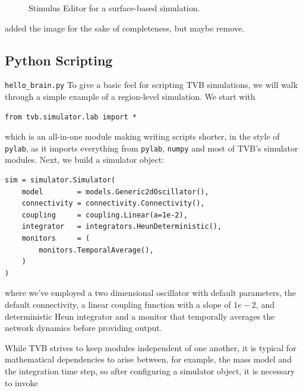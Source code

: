   \begin{figure}[!htbp]
    \centering
    \caption{Stimulus Editor for a surface-based simulation.}
        \label{fig:stimulus}
  \end{figure}

  \note[psl] added the image for the sake of completeness, but maybe remove.  


\subsection{Python Scripting}

\texttt{hello\_brain.py}
To give a basic feel for scripting TVB simulations, we will 
walk through a simple example of a region-level simulation. We 
start with

\begin{lstlisting}
from tvb.simulator.lab import *
\end{lstlisting}

\noindent which is an all-in-one module making writing scripts
shorter, in the style of \texttt{pylab}, as it imports everything
from \texttt{pylab}, \texttt{numpy} and most of TVB's simulator
modules. Next, we build a simulator object:

\begin{lstlisting}
sim = simulator.Simulator(
    model        = models.Generic2dOscillator(), 
    connectivity = connectivity.Connectivity(),
    coupling     = coupling.Linear(a=1e-2),
    integrator   = integrators.HeunDeterministic(),
    monitors     = (
        monitors.TemporalAverage(), 
    )
)
\end{lstlisting}

\noindent where we've employed a two dimensional oscillator
with default parameters, the default connectivity, a linear 
coupling function with a slope of $1e-2$, and deterministic
Heun integrator and a monitor that temporally averages the 
network dynamics before providing output.

While TVB strives to keep modules independent of one another,
it is typical for mathematical dependencies to arise between, 
for example, the mass model and the integration time step, so
after configuring a simulator object, it is necessary to invoke

